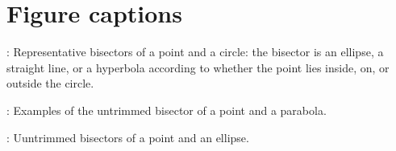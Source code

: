 \section*{Figure captions}

\bigskip
{}:
Representative bisectors of a point and a circle: the bisector is
an ellipse, a straight line, or a hyperbola according to whether the
point lies inside, on, or outside the circle.

\medskip
{}:
Examples of the untrimmed bisector of a point and a parabola.

\medskip
{}:
Uuntrimmed bisectors of a point and an ellipse.



